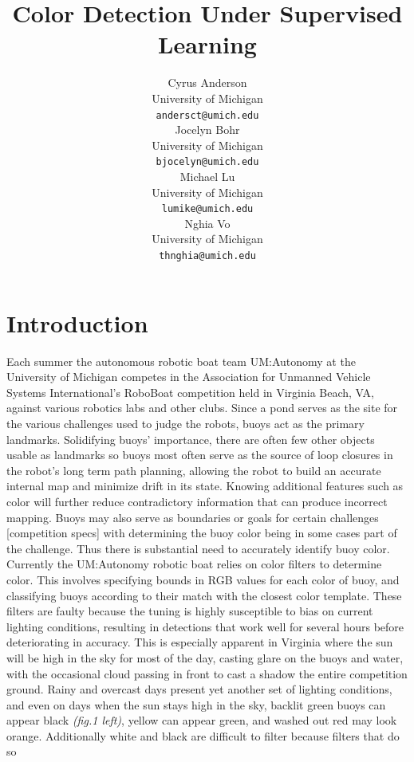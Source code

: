\documentclass{article} %
\title{Color Detection Under Supervised Learning}
\author{
Cyrus Anderson \\
University of Michigan \\
\texttt{andersct@umich.edu} \\
\And
Jocelyn Bohr \\
University of Michigan \\
\texttt{bjocelyn@umich.edu} \\
\AND
Michael Lu \\
University of Michigan \\
\texttt{lumike@umich.edu} \\
\And
Nghia Vo \\
University of Michigan \\
\texttt{thnghia@umich.edu} \\
}
\begin{document}
\maketitle

\begin{abstract}

\end{abstract}

\section{Introduction}
Each summer the autonomous robotic boat team UM:Autonomy at the University of Michigan competes in the Association for 
Unmanned Vehicle Systems International's RoboBoat competition held in Virginia Beach, VA, against various robotics labs 
and other clubs. Since a pond serves as the site for the various challenges used to judge the robots, buoys act as the primary 
landmarks. Solidifying buoys' importance, there are often few other objects usable as landmarks so buoys most often serve 
as the source of loop closures in the robot's long term path planning, allowing the robot to build an accurate internal map 
and minimize drift in its state. Knowing additional features such as color will further reduce contradictory information 
that can produce incorrect mapping. Buoys may also serve as boundaries or goals for certain challenges [competition specs] 
with determining the buoy color being in some cases part of the challenge. Thus there is substantial need to accurately identify 
buoy color.
\\Currently the UM:Autonomy robotic boat relies on color filters to determine color. This involves specifying bounds in RGB values for each color of buoy, and classifying buoys according to their match with the closest color template. These filters 
are faulty because the tuning is highly susceptible to bias on current lighting conditions, resulting in detections that work 
well for several hours before deteriorating in accuracy. This is especially apparent in Virginia where the sun will be high 
in the sky for most of the day, casting glare on the buoys and water, with the occasional cloud passing in front to cast 
a shadow the entire competition ground. Rainy and overcast days present yet another set of lighting conditions, and 
even on days when the sun stays high in the sky, backlit green buoys can appear black \textit{(fig.1 left)}, yellow can appear
green, and washed out red may look orange. Additionally white and black are difficult to filter because filters that do so 
\end{document}
